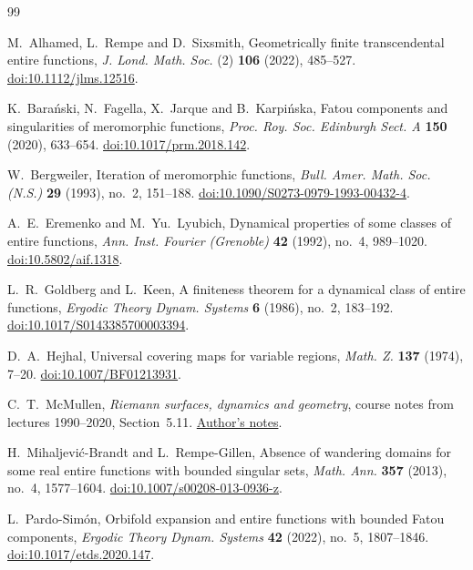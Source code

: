 \documentclass[11pt,reqno]{amsart}
\theoremstyle{definition}
\numberwithin{equation}{section}
\begin{document}
\begin{thebibliography}{99}

M.~Alhamed, L.~Rempe and D.~Sixsmith, Geometrically finite transcendental entire functions,
\emph{J. Lond. Math. Soc.} (2) \textbf{106} (2022), 485--527.
\href{https://doi.org/10.1112/jlms.12516}{doi:10.1112/jlms.12516}.

K.~Bara\'nski, N.~Fagella, X.~Jarque and B.~Karpi\'nska, Fatou components and singularities of meromorphic functions,
\emph{Proc. Roy. Soc. Edinburgh Sect. A} \textbf{150} (2020), 633--654.
\href{https://doi.org/10.1017/prm.2018.142}{doi:10.1017/prm.2018.142}.

W.~Bergweiler, Iteration of meromorphic functions,
\emph{Bull. Amer. Math. Soc. (N.S.)} \textbf{29} (1993), no.~2, 151--188.
\href{https://doi.org/10.1090/S0273-0979-1993-00432-4}{doi:10.1090/S0273-0979-1993-00432-4}.

A.~E.~Eremenko and M.~Yu.~Lyubich, Dynamical properties of some classes of entire functions,
\emph{Ann. Inst. Fourier (Grenoble)} \textbf{42} (1992), no.~4, 989--1020.
\href{https://doi.org/10.5802/aif.1318}{doi:10.5802/aif.1318}.

L.~R.~Goldberg and L.~Keen, A finiteness theorem for a dynamical class of entire functions,
\emph{Ergodic Theory Dynam. Systems} \textbf{6} (1986), no.~2, 183--192.
\href{https://doi.org/10.1017/S0143385700003394}{doi:10.1017/S0143385700003394}.

D.~A.~Hejhal, Universal covering maps for variable regions,
\emph{Math. Z.} \textbf{137} (1974), 7--20.\newline
\href{https://doi.org/10.1007/BF01213931}{doi:10.1007/BF01213931}.

C.~T.~McMullen, \emph{Riemann surfaces, dynamics and geometry},
course notes from lectures 1990--2020, Section~5.11.
\href{https://people.math.harvard.edu/~ctm/papers/home/text/class/notes/rs/course.pdf}{Author's notes}.

H.~Mihaljevi\'c-Brandt and L.~Rempe-Gillen, Absence of wandering domains for some real entire functions with bounded singular sets,
\emph{Math. Ann.} \textbf{357} (2013), no.~4, 1577--1604.
\href{https://doi.org/10.1007/s00208-013-0936-z}{doi:10.1007/s00208-013-0936-z}.

L.~Pardo-Sim\'on, Orbifold expansion and entire functions with bounded Fatou components,
\emph{Ergodic Theory Dynam. Systems} \textbf{42} (2022), no.~5, 1807--1846.
\href{https://doi.org/10.1017/etds.2020.147}{doi:10.1017/etds.2020.147}.


\end{thebibliography}
\end{document}
